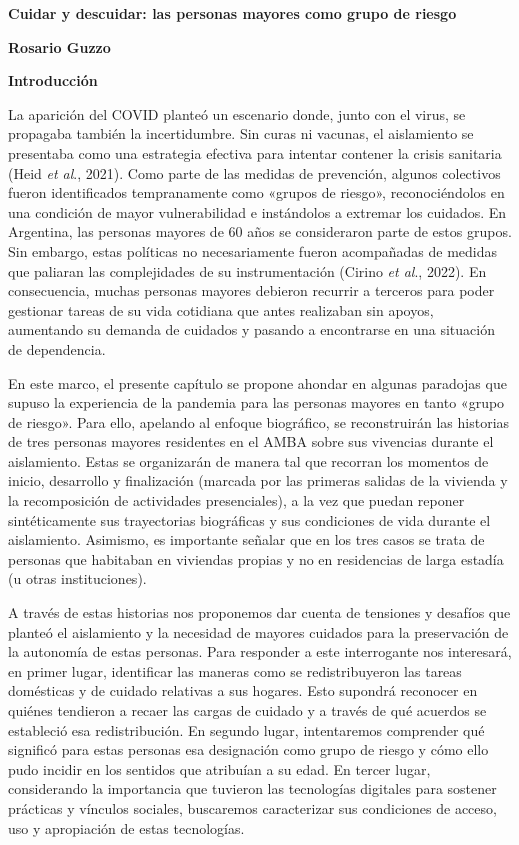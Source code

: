 \textbf{Cuidar y descuidar: las personas mayores como grupo de riesgo}

\textbf{Rosario Guzzo}

\textbf{Introducción}

La aparición del COVID planteó un escenario donde, junto con el virus, se propagaba también la incertidumbre. Sin curas ni vacunas, el aislamiento se presentaba como una estrategia efectiva para intentar contener la crisis sanitaria (Heid \emph{et al}., 2021). Como parte de las medidas de prevención, algunos colectivos fueron identificados tempranamente como «grupos de riesgo», reconociéndolos en una condición de mayor vulnerabilidad e instándolos a extremar los cuidados. En Argentina, las personas mayores de 60 años se consideraron parte de estos grupos. Sin embargo, estas políticas no necesariamente fueron acompañadas de medidas que paliaran las complejidades de su instrumentación (Cirino \emph{et al}., 2022). En consecuencia, muchas personas mayores debieron recurrir a terceros para poder gestionar tareas de su vida cotidiana que antes realizaban sin apoyos, aumentando su demanda de cuidados y pasando a encontrarse en una situación de dependencia.

En este marco, el presente capítulo se propone ahondar en algunas paradojas que supuso la experiencia de la pandemia para las personas mayores en tanto «grupo de riesgo». Para ello, apelando al enfoque biográfico, se reconstruirán las historias de tres personas mayores residentes en el AMBA sobre sus vivencias durante el aislamiento. Estas se organizarán de manera tal que recorran los momentos de inicio, desarrollo y finalización (marcada por las primeras salidas de la vivienda y la recomposición de actividades presenciales), a la vez que puedan reponer sintéticamente sus trayectorias biográficas y sus condiciones de vida durante el aislamiento. Asimismo, es importante señalar que en los tres casos se trata de personas que habitaban en viviendas propias y no en residencias de larga estadía (u otras instituciones).

A través de estas historias nos proponemos dar cuenta de tensiones y desafíos que planteó el aislamiento y la necesidad de mayores cuidados para la preservación de la autonomía de estas personas. Para responder a este interrogante nos interesará, en primer lugar, identificar las maneras como se redistribuyeron las tareas domésticas y de cuidado relativas a sus hogares. Esto supondrá reconocer en quiénes tendieron a recaer las cargas de cuidado y a través de qué acuerdos se estableció esa redistribución. En segundo lugar, intentaremos comprender qué significó para estas personas esa designación como grupo de riesgo y cómo ello pudo incidir en los sentidos que atribuían a su edad. En tercer lugar, considerando la importancia que tuvieron las tecnologías digitales para sostener prácticas y vínculos sociales, buscaremos caracterizar sus condiciones de acceso, uso y apropiación de estas tecnologías.

